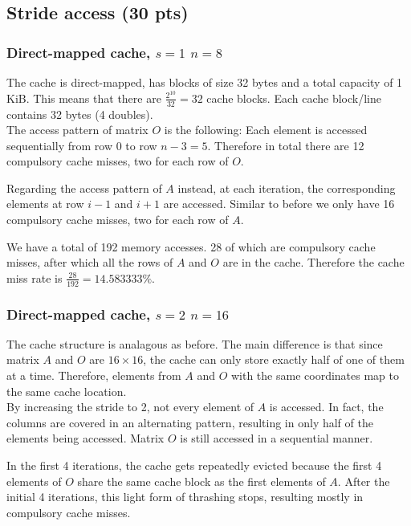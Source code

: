 \renewcommand{\thesubsubsection}{\alph{subsubsection})}
\setcounter{section}{4}
\setcounter{subsection}{0}
\renewcommand{\thesubsubsection}{\alph{subsubsection})}

\subsection{Stride access (30 pts)}
\subsubsection{Direct-mapped cache, $s=1$ $n=8$}
The cache is direct-mapped, has blocks of size 32 bytes and a total capacity of 1 KiB. This means that there are $\frac{2^{10}}{32} = 32$ cache blocks. Each cache block/line contains 32 bytes (4 doubles).\\

The access pattern of matrix $O$ is the following: Each element is accessed sequentially from row $0$ to row $n-3=5$. Therefore in total there are 12 compulsory cache misses, two for each row of $O$.

Regarding the access pattern of $A$ instead, at each iteration, the corresponding elements at row $i-1$ and $i+1$ are accessed. Similar to before we only have 16 compulsory cache misses, two for each row of $A$.

We have a total of 192 memory accesses. 28 of which are compulsory cache misses, after which all the rows of $A$ and $O$ are in the cache. Therefore the cache miss rate is $\frac{28}{192}  = 14.583333\%$.\vspace*{-0.4cm}
\subsubsection{Direct-mapped cache, $s=2$ $n=16$}
The cache structure is analagous as before. The main difference is that since matrix $A$ and $O$ are $16\times16$, the cache can only store exactly half of one of them at a time. Therefore, elements from $A$ and $O$ with the same coordinates map to the same cache location.\\
By increasing the stride to 2, not every element of $A$ is accessed. In fact, the columns are covered in an alternating pattern, resulting in only half of the elements being accessed. Matrix $O$ is still accessed in a sequential manner.

In the first 4 iterations, the cache gets repeatedly evicted because the first 4 elements of $O$ share the same cache block as the first elements of $A$. After the initial 4 iterations, this light form of thrashing stops, resulting mostly in compulsory cache misses.


